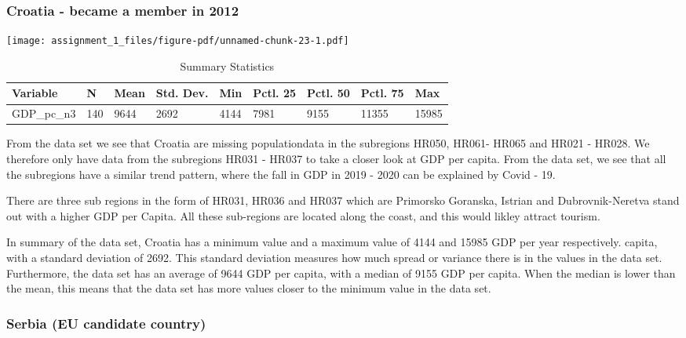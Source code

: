 \documentclass[
  letterpaper,
  DIV=11,
  numbers=noendperiod]{scrartcl}
\begin{document}
\hypertarget{croatia---became-a-member-in-2012}{%
\subsubsection{Croatia - became a member in
2012}\label{croatia---became-a-member-in-2012}}

\texttt{[image: assignment\_1\_files/figure-pdf/unnamed-chunk-23-1.pdf]}

\begin{table}

\caption{Summary Statistics}
\centering
\begin{tabular}[t]{lllllllll}
\toprule
Variable & N & Mean & Std. Dev. & Min & Pctl. 25 & Pctl. 50 & Pctl. 75 & Max\\
\midrule
GDP_pc_n3 & 140 & 9644 & 2692 & 4144 & 7981 & 9155 & 11355 & 15985\\
\bottomrule
\end{tabular}
\end{table}

From the data set we see that Croatia are missing populationdata in the
subregions HR050, HR061- HR065 and HR021 - HR028. We therefore only have
data from the subregions HR031 - HR037 to take a closer look at GDP per
capita. From the data set, we see that all the subregions have a similar
trend pattern, where the fall in GDP in 2019 - 2020 can be explained by
Covid - 19.

There are three sub regions in the form of HR031, HR036 and HR037 which
are Primorsko Goranska, Istrian and Dubrovnik-Neretva stand out with a
higher GDP per Capita. All these sub-regions are located along the
coast, and this would likley attract tourism.

In summary of the data set, Croatia has a minimum value and a maximum
value of 4144 and 15985 GDP per year respectively. capita, with a
standard deviation of 2692. This standard deviation measures how much
spread or variance there is in the values in the data set. Furthermore,
the data set has an average of 9644 GDP per capita, with a median of
9155 GDP per capita. When the median is lower than the mean, this means
that the data set has more values closer to the minimum value in the
data set.

\hypertarget{serbia-eu-candidate-country}{%
\subsubsection{Serbia (EU candidate
country)}\label{serbia-eu-candidate-country}}
\end{document}

